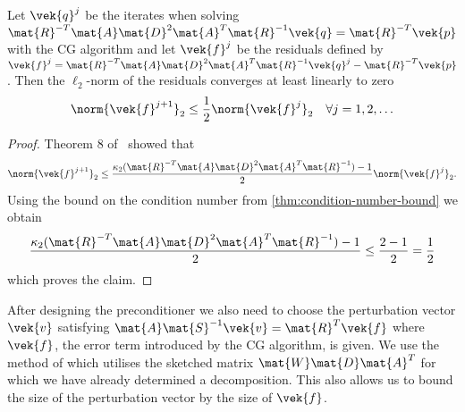 \begin{theorem}\label{thm:cg-residual-bound}
Let \(\vek{q}^j\) be the iterates when solving \( \mat{R}^{-T} \mat{A} \mat{D}^2 \mat{A}^T \mat{R}^{-1} \vek{q} = \mat{R}^{-T} \vek{p} \) with the CG algorithm and let \(\vek{f}^j\) be the residuals defined by
\( \vek{f}^j = \mat{R}^{-T} \mat{A} \mat{D}^2 \mat{A}^T \mat{R}^{-1} \vek{q}^j - \mat{R}^{-T} \vek{p} \).
Then the \(\ell_2\)-norm of the residuals converges at least linearly to zero
\[ \norm{\vek{f}^{j+1}}_2 \leq \frac{1}{2} \norm{ \vek{f}^j }_2 \quad \forall j = 1, 2, \ldots \]
\end{theorem}
\begin{proof}
Theorem 8 of~\cite{Bouyouli-ConjugateGradientConvergence} showed that
\[ \norm{\vek{f}^{j+1}}_2 \leq \frac{\kappa_2(\mat{R}^{-T} \mat{A} \mat{D}^2 \mat{A}^T \mat{R}^{-1}) - 1}{2} \norm{\vek{f}^j}_2 .\]
Using the bound on the condition number from \cref{thm:condition-number-bound} we obtain
\[ \frac{\kappa_2(\mat{R}^{-T} \mat{A} \mat{D}^2 \mat{A}^T \mat{R}^{-1}) - 1}{2}
   \leq \frac{2 - 1}{2} = \frac{1}{2} \]
which proves the claim.
\end{proof}

After designing the preconditioner we also need to choose the perturbation vector \(\vek{v}\) satisfying \(\mat{A}\mat{S}^{-1}\vek{v} = \mat{R}^T \vek{f}\) where \(\vek{f}\), the error term introduced by the CG algorithm, is given.
We use the method of \textcite{Avron-FasterRandomizedInfeasibleIPMs} which utilises the sketched matrix \(\mat{W}\mat{D}\mat{A}^T\) for which we have already determined a decomposition.
This also allows us to bound the size of the perturbation vector by the size of \(\vek{f}\).

